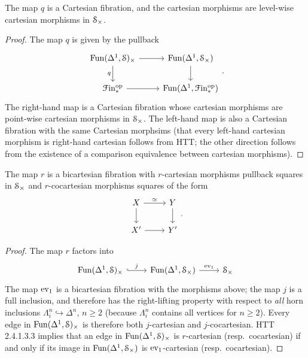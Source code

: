 \documentclass[main.tex]{subfiles}
\begin{document}
\begin{lemma}
  The map $q$ is a Cartesian fibration, and the cartesian morphisms are level-wise cartesian morphisms in $\S_{\times}$.
\end{lemma}
\begin{proof}
  The map $q$ is given by the pullback
  \begin{equation*}
    \begin{tikzcd}
      \Fun(\Delta^{1}, \category{S})_{\times}
      \arrow[r]
      \arrow[d, swap, "q"]
      & \Fun(\Delta^{1}, \category{S}_{\times})
      \arrow[d]
      \\
      \Finp\op
      \arrow[r]
      & \Fun(\Delta^{1}, \Finp\op)
    \end{tikzcd}.
  \end{equation*}
  The right-hand map is a Cartesian fibration whose cartesian morphisms are point-wise cartesian morphisms in $\S_{\times}$. The left-hand map is also a Cartesian fibration with the same Cartesian morphsims (that every left-hand cartesian morphism is right-hand cartesian follows from HTT; the other direction follows from the existence of a comparison equivalence between cartesian morphisms).
\end{proof}

\begin{lemma}
  \label{lemma:map_on_cartesian_cats_is_bicart_fib}
  The map $r$ is a bicartesian fibration with $r$-cartesian morphisms pullback squares in $\S_{\times}$ and $r$-cocartesian morphisms squares of the form
  \begin{equation*}
    \begin{tikzcd}
      X
      \arrow[r, "\simeq"]
      \arrow[d]
      & Y
      \arrow[d]
      \\
      X'
      \arrow[r]
      & Y'
    \end{tikzcd}.
  \end{equation*}
\end{lemma}
\begin{proof}
  The map $r$ factors into
  \begin{equation*}
    \begin{tikzcd}
      \Fun(\Delta^{1}, \S)_{\times}
      \arrow[r, hook, "j"]
      & \Fun(\Delta^{1}, \S_{\times})
      \arrow[r, "\ev_{1}"]
      & \S_{\times}
    \end{tikzcd}
  \end{equation*}
  The map $\ev_{1}$ is a bicartesian fibration with the morphisms above; the map $j$ is a full inclusion, and therefore has the right-lifting property with respect to \emph{all} horn inclusions $\Lambda^{n}_{i} \hookrightarrow \Delta^{n}$, $n \geq 2$ (because $\Lambda^{n}_{i}$ contains all vertices for $n \geq 2$). Every edge in $\Fun(\Delta^{1}, \S)_{\times}$ is therefore both $j$-cartesian and $j$-cocartesian. HTT 2.4.1.3.3 implies that an edge in $\Fun(\Delta^{1}, \S)_{\times}$ is $r$-cartesian (resp.\ cocartesian) if and only if its image in $\Fun(\Delta^{1}, \S_{\times})$ is $\ev_{1}$-cartesian (resp.\ cocartesian).
\end{proof}
\end{document}
